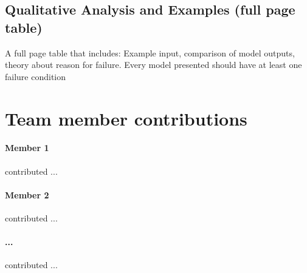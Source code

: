 \documentclass[11pt,a4paper]{article}
\begin{document}
\clearpage
\subsection{Qualitative Analysis and Examples (full page table)}
A full page table that includes: Example input, comparison of model outputs, theory about reason for failure. Every model presented should have at least one failure condition

\clearpage
\section{Team member contributions}
\paragraph{Member 1} contributed ...

\paragraph{Member 2} contributed ...

\paragraph{...} contributed ...





\end{document}
